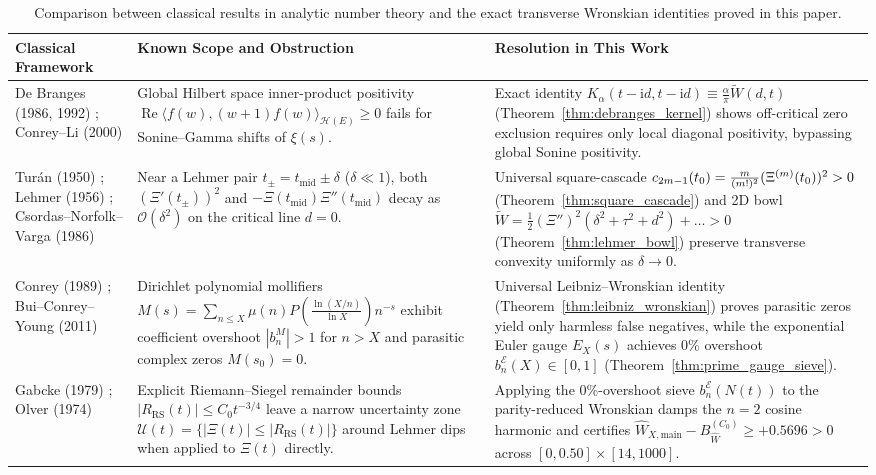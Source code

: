 \documentclass[11pt,reqno,a4paper]{amsart}
\theoremstyle{plain}
\theoremstyle{definition}
\theoremstyle{remark}
\numberwithin{equation}{section}
\newcommand{\fac}{\mathclose{\mathchar"0021}}
\newcommand{\ii}{\mathrm{i}}
\begin{document}
\begin{table}[htbp]
\centering
\caption{Comparison between classical results in analytic number theory and the exact transverse Wronskian identities proved in this paper.}
\label{tab:literature_comparison}
\footnotesize
\setlength{\tabcolsep}{4.5pt}
\renewcommand{\arraystretch}{1.22}
\begin{tabular}{@{}p{}p{}p{}@{}}
\toprule
\textbf{Classical Framework} & \textbf{Known Scope and Obstruction} & \textbf{Resolution in This Work} \\
\midrule
De Branges (1986, 1992) \cite{deBranges1986,deBranges1992}; Conrey--Li (2000) \cite{ConreyLi2000} &
Global Hilbert space inner-product positivity $\operatorname{Re}\langle f(w), (w+1)f(w)\rangle_{\mathcal{H}(E)} \ge 0$ fails for Sonine--Gamma shifts of $\xi(s)$. &
Exact identity $K_\alpha(t-\ii d,t-\ii d) \equiv \frac{\alpha}{\pi}\widetilde{W}(d,t)$ (Theorem~\ref{thm:debranges_kernel}) shows off-critical zero exclusion requires only local diagonal positivity, bypassing global Sonine positivity. \\
\addlinespace[2pt]
Tur\'an (1950) \cite{Turan1950}; Lehmer (1956) \cite{Lehmer1956}; Csordas--Norfolk--Varga (1986) \cite{CsordasNorfolkVarga1986} &
Near a Lehmer pair $t_\pm = t_{\mathrm{mid}} \pm \delta$ ($\delta \ll 1$), both $(\Xi'(t_\pm))^2$ and $-\Xi(t_{\mathrm{mid}})\Xi''(t_{\mathrm{mid}})$ decay as $\mathcal{O}(\delta^2)$ on the critical line $d = 0$. &
Universal square-cascade $c_{2m-1}(t_0) = \frac{m}{(m\fac)^2}(\Xi^{(m)}(t_0))^2 > 0$ (Theorem~\ref{thm:square_cascade}) and 2D bowl $\widetilde{W} = \frac{1}{2}(\Xi'')^2(\delta^2+\tau^2+d^2)+\dots > 0$ (Theorem~\ref{thm:lehmer_bowl}) preserve transverse convexity uniformly as $\delta \to 0$. \\
\addlinespace[2pt]
Conrey (1989) \cite{Conrey1989}; Bui--Conrey--Young (2011) \cite{BuiConreyYoung2011} &
Dirichlet polynomial mollifiers $M(s) = \sum_{n \le X}\mu(n)P(\frac{\ln(X/n)}{\ln X})n^{-s}$ exhibit coefficient overshoot $|b_n^M| > 1$ for $n > X$ and parasitic complex zeros $M(s_0)=0$. &
Universal Leibniz--Wronskian identity (Theorem~\ref{thm:leibniz_wronskian}) proves parasitic zeros yield only harmless false negatives, while the exponential Euler gauge $E_X(s)$ achieves $0\%$ overshoot $b_n^{\mathcal{E}}(X) \in [0,1]$ (Theorem~\ref{thm:prime_gauge_sieve}). \\
\addlinespace[2pt]
Gabcke (1979) \cite{Gabcke1979}; Olver (1974) \cite{Olver1974} &
Explicit Riemann--Siegel remainder bounds $|R_{\mathrm{RS}}(t)| \le C_0 t^{-3/4}$ leave a narrow uncertainty zone $\mathcal{U}(t) = \{|\Xi(t)| \le |R_{\mathrm{RS}}(t)|\}$ around Lehmer dips when applied to $\Xi(t)$ directly. &
Applying the $0\%$-overshoot sieve $b_n^{\mathcal{E}}(N(t))$ to the parity-reduced Wronskian damps the $n=2$ cosine harmonic and certifies $\widehat{W}_{X,\mathrm{main}} - B_{\widehat{W}}^{(C_0)} \ge +0.5696 > 0$ across $[0,0.50]\times[14,1000]$. \\
\bottomrule
\end{tabular}
\end{table}
\end{document}
